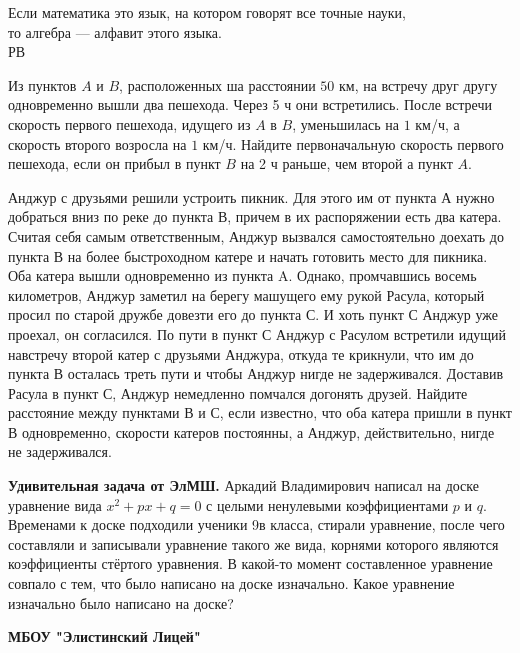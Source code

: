 \begin{flushright}
        \scriptsize{Если математика это язык, на котором говорят все точные науки,\\то алгебра --- алфавит этого языка.\\РВ}
\end{flushright}

Из пунктов $A$ и $B$, расположенных ша расстоянии $50$ км, на встречу друг другу одновременно вышли два пешехода. Через 5 ч они встретились. После встречи скорость первого пешехода, идущего из $A$ в $B$, уменьшилась на $1$ км/ч, а скорость второго возросла на $1$ км/ч. Найдите первоначальную скорость первого пешехода, если он прибыл в пункт $B$ на 2 ч раньше, чем второй а пункт $A$.

Анджур с друзьями решили устроить пикник. Для этого им от пункта А нужно добраться вниз по реке до пункта В, причем в их распоряжении есть два катера. Считая себя самым ответственным, Анджур вызвался самостоятельно доехать до пункта В на более быстроходном катере и начать готовить место для пикника. Оба катера вышли одновременно из пункта A. Однако, промчавшись восемь километров, Анджур заметил на берегу машущего ему рукой Расула, который просил по старой дружбе довезти его до пункта С. И хоть пункт С Анджур уже проехал, он согласился. По пути в пункт С Анджур с Расулом встретили идущий навстречу второй катер с друзьями Анджура, откуда те крикнули, что им до пункта В осталась треть пути и чтобы Анджур нигде не задерживался. Доставив Расула в пункт С, Анджур немедленно помчался догонять друзей. Найдите расстояние между пунктами В и С, если известно, что оба катера пришли в пункт В одновременно, скорости катеров постоянны, а Анджур, действительно, нигде не задерживался.

\textbf{Удивительная задача от ЭлМШ.} Аркадий Владимирович написал на доске уравнение вида  $x^2 + px + q = 0$  с целыми ненулевыми коэффициентами $p$ и $q$. Временами к доске подходили ученики 9в класса, стирали уравнение, после чего составляли и записывали уравнение такого же вида, корнями которого являются коэффициенты стёртого уравнения. В какой-то момент составленное уравнение совпало с тем, что было написано на доске изначально. Какое уравнение изначально было написано на доске?

\vspace{-0.5mm}

\centerline{\bf \large МБОУ "Элистинский Лицей"}